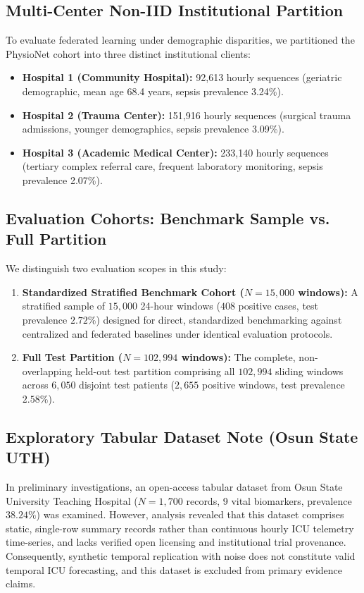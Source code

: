 \documentclass[final,5p,times,twocolumn]{elsarticle}
\begin{document}
\subsection{Multi-Center Non-IID Institutional Partition}
To evaluate federated learning under demographic disparities, we partitioned the PhysioNet cohort into three distinct institutional clients:
\begin{itemize}
    \item \textbf{Hospital 1 (Community Hospital):} 92,613 hourly sequences (geriatric demographic, mean age 68.4 years, sepsis prevalence 3.24\%).
    \item \textbf{Hospital 2 (Trauma Center):} 151,916 hourly sequences (surgical trauma admissions, younger demographics, sepsis prevalence 3.09\%).
    \item \textbf{Hospital 3 (Academic Medical Center):} 233,140 hourly sequences (tertiary complex referral care, frequent laboratory monitoring, sepsis prevalence 2.07\%).
\end{itemize}

\subsection{Evaluation Cohorts: Benchmark Sample vs. Full Partition}
We distinguish two evaluation scopes in this study:
\begin{enumerate}
    \item \textbf{Standardized Stratified Benchmark Cohort ($N=15,000$ windows):} A stratified sample of $15,000$ 24-hour windows ($408$ positive cases, test prevalence $2.72\%$) designed for direct, standardized benchmarking against centralized and federated baselines under identical evaluation protocols.
    \item \textbf{Full Test Partition ($N=102,994$ windows):} The complete, non-overlapping held-out test partition comprising all $102,994$ sliding windows across $6,050$ disjoint test patients ($2,655$ positive windows, test prevalence $2.58\%$).
\end{enumerate}

\subsection{Exploratory Tabular Dataset Note (Osun State UTH)}
In preliminary investigations, an open-access tabular dataset from Osun State University Teaching Hospital ($N=1,700$ records, 9 vital biomarkers, prevalence $38.24\%$) was examined. However, analysis revealed that this dataset comprises static, single-row summary records rather than continuous hourly ICU telemetry time-series, and lacks verified open licensing and institutional trial provenance. Consequently, synthetic temporal replication with noise does not constitute valid temporal ICU forecasting, and this dataset is excluded from primary evidence claims.
\end{document}
